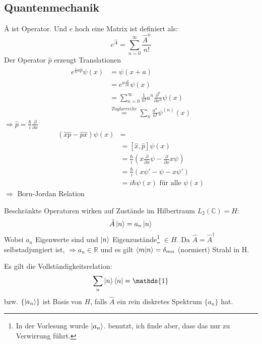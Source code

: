 \subsection{Quantenmechanik}
		\^{A} ist Operator. Und $e$ hoch eine Matrix ist definiert als:
			\begin{equation*}
				e^{\hat{A}}= \sum_{n=0}^{\infty} \frac{\hat{A}^n}{n!}
			\end{equation*}
		Der Operator $\hat{p}$ erzeugt Translationen
			\begin{align*}
				e^{\frac{i}{\hbar} a \hat{p}} \psi(x) &= 
				\psi(x+a) \\
				&= e^{a \frac{\partial}{\partial x}} \psi(x) \\
				&= \sum_{n=0}^{\infty} \frac{1}{n!} a^n \frac{\partial^n}{\partial x^n} \psi(x) \\
				& \overset{Taylorreihe}{=} 
				\sum_{n} \frac{a^n}{n!} \psi^{(n)}(x)				
			\end{align*}
		$\Rightarrow \hat{p} = \frac{\hbar}{i} \frac{\partial}{\partial x}$
			\begin{align*}
				(\hat{x} \hat{p} - \hat{p} \hat{x}) \psi(x) &= \\
				&= [\hat{x}, \hat{p}] \psi(x) \\
				&= \frac{\hbar}{i} 
				\left( x \frac{\partial}{\partial x} \psi 
				- \frac{\partial}{\partial x} x \psi
				\right) \\
				&=\frac{\hbar}{i} \left( x \psi' - \psi - x\psi' \right) \\
				&=i \hbar \psi(x) \text{~für alle~} \psi (x)
			\end{align*}
		$ \Rightarrow$  \hspace{0.6cm} Born-Jordan Relation
		
		Beschränkte Operatoren wirken auf Zustände im Hilbertraum $L_2(\mathds{C}) = H$:
			\begin{equation*}
				\hat{A} \ket{n} = a_n \ket{n} 
			\end{equation*}
		Wobei $a_n$ Eigenwerte sind und $\ket{n}$ Eigenzustände\footnote{In der Vorlesung wurde $\ket{a_n}$. benutzt, ich finde aber, dass das nur zu Verwirrung führt.} $\in H$.
		Da $\hat{A} = \hat{A}^\dagger$ selbstadjungiert ist, $\Rightarrow a_n \in \mathds{R}$ und es gilt $\braket{m | n} = \delta_{mn}$ (normiert) \grqq Strahl in H\grqq.
		
		Es gilt die Vollständigkeitsrelation:
			\begin{equation*}
				\sum_n \ket{n} \bra{n} = \mathds{1}
			\end{equation*}
		bzw. $\{ \ket{a_n} \}$ ist Basis von $H$, falls $\hat{A}$ ein rein diskretes Spektrum $\{a_n\}$ hat. 
		

